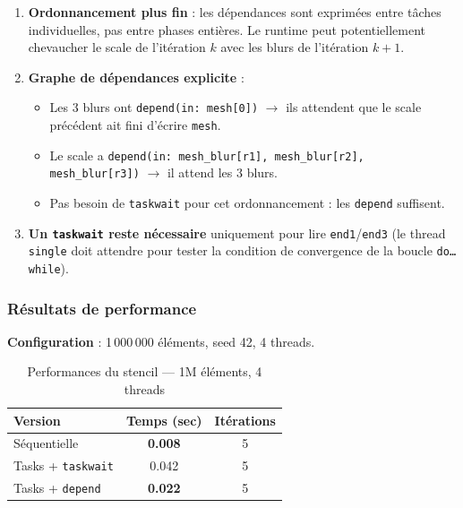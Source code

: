 \documentclass[12pt,a4paper]{article}
\begin{document}
\begin{enumerate}
  \item \textbf{Ordonnancement plus fin} : les dépendances sont exprimées entre
    tâches individuelles, pas entre phases entières. Le runtime peut
    potentiellement chevaucher le scale de l'itération $k$ avec les blurs de
    l'itération $k+1$.

  \item \textbf{Graphe de dépendances explicite} :
    \begin{itemize}
      \item Les 3 blurs ont \texttt{depend(in: mesh[0])} $\rightarrow$ ils
        attendent que le scale précédent ait fini d'écrire \texttt{mesh}.
      \item Le scale a \texttt{depend(in: mesh\_blur[r1], mesh\_blur[r2],
        mesh\_blur[r3])} $\rightarrow$ il attend les 3 blurs.
      \item Pas besoin de \texttt{taskwait} pour cet ordonnancement : les
        \texttt{depend} suffisent.
    \end{itemize}

  \item \textbf{Un \texttt{taskwait} reste nécessaire} uniquement pour lire
    \texttt{end1}/\texttt{end3} (le thread \texttt{single} doit attendre pour
    tester la condition de convergence de la boucle \texttt{do\ldots while}).
\end{enumerate}

\subsubsection{Résultats de performance}

\textbf{Configuration} : 1\,000\,000 éléments, seed 42, 4 threads.

\begin{table}[h!]
\centering
\begin{tabular}{lcc}
\toprule
\textbf{Version} & \textbf{Temps (sec)} & \textbf{Itérations} \\
\midrule
Séquentielle             & \textbf{0.008} & 5 \\
Tasks + \texttt{taskwait} & 0.042          & 5 \\
Tasks + \texttt{depend}   & \textbf{0.022} & 5 \\
\bottomrule
\end{tabular}
\caption{Performances du stencil --- 1M éléments, 4 threads}
\end{table}
\end{document}
